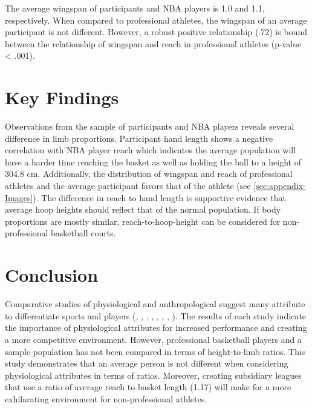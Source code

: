 \documentclass[]{article}
\begin{document}
The average wingspan of participants and NBA players is 1.0 and 1.1,
respectively. When compared to professional athletes, the wingspan of an
average participant is not different. However, a robust positive
relationship (.72) is bound between the relationship of wingspan and
reach in professional athletes (p-value \textless{} .001).

\section{Key Findings}
\label{sec:findings}

Observations from the sample of participants and NBA players reveals
several difference in limb proportions. Participant hand length shows a
negative correlation with NBA player reach which indicates the average
population will have a harder time reaching the basket as well as
holding the ball to a height of 304.8 cm. Additionally, the distribution
of wingspan and reach of professional athletes and the average
participant favors that of the athlete (see \ref{sec:appendix-Images}).
The difference in reach to hand length is supportive evidence that
average hoop heights should reflect that of the normal population. If
body proportions are mostly similar, reach-to-hoop-height can be
considered for non-professional basketball courts.

\section{Conclusion}
\label{sec:conclusion}

Comparative studies of physiological and anthropological suggest many
attribute to differentiate sports and players (\citep{vaquera:2015},
\citep{masanovic:2018}, \citep{korkmaz:2020}, \citep{drinkwater:2008},
\citep{strumbelj:2014}, \citep{ljubojevic:2020}, \citep{gryko:2018},
\citep{bayios:2006}). The results of each study indicate the importance
of physiological attributes for increased performance and creating a
more competitive environment. However, professional basketball players
and a sample population has not been compared in terms of height-to-limb
ratios. This study demonstrates that an average person is not different
when considering physiological attributes in terms of ratios. Moreover,
creating subsidiary leagues that use a ratio of average reach to basket
length (1.17) will make for a more exhilarating environment for
non-professional athletes.

\newpage
\end{document}
